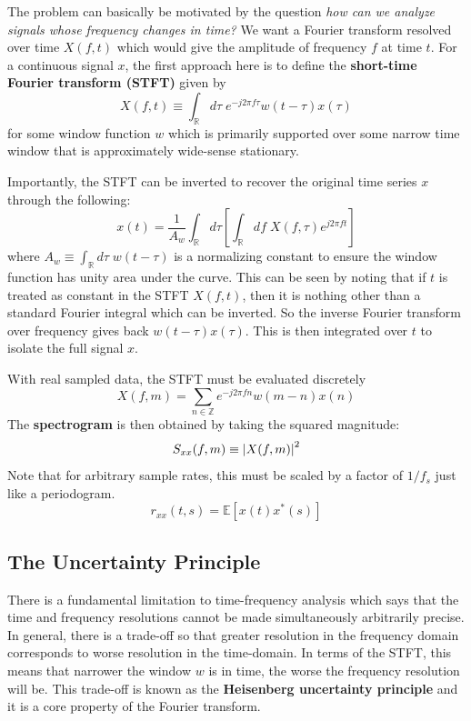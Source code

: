 \documentclass[twocolumn]{gwclass}
\newcommand{\R}{\mathbb{R}}
\newcommand{\Z}{\mathbb{Z}}
\begin{document}
The problem can basically be motivated by the question \emph{how can we analyze signals whose frequency changes in time?} We want a Fourier transform resolved over time $X(f,t)$ which would give the amplitude of frequency $f$ at time $t$. For a continuous signal $x$, the first approach here is to define the \textbf{short-time Fourier transform (STFT)} given by
$$ X(f,t) \equiv \int_\R d\tau\;e^{-j2\pi f \tau}w(t-\tau)x(\tau) $$
for some window function $w$ which is primarily supported over some narrow time window that is approximately wide-sense stationary. 

Importantly, the STFT can be inverted to recover the original time series $x$ through the following:
$$ x(t) = \frac{1}{A_w}\int_\R d\tau\left[\int_\R df\;X(f,\tau)e^{j2\pi f t}\right] $$
where $A_w\equiv \int_\R d\tau\;w(t-\tau)$ is a normalizing constant to ensure the window function has unity area under the curve. This can be seen by noting that if $t$ is treated as constant in the STFT $X(f,t)$, then it is nothing other than a standard Fourier integral which can be inverted. So the inverse Fourier transform over frequency gives back $w(t-\tau)x(\tau)$. This is then integrated over $t$ to isolate the full signal $x$.

With real sampled data, the STFT must be evaluated discretely
$$ X(f,m) = \sum_{n\in\Z} e^{-j2\pi fn}w(m-n)x(n) $$
The \textbf{spectrogram} is then obtained by taking the squared magnitude:
$$ S_{xx}(f,m) \equiv \abs{X(f,m)}^2 $$
Note that for arbitrary sample rates, this must be scaled by a factor of $1/f_s$ just like a periodogram.
$$ r_{xx}(t,s)=\mathbb{E}[x(t)x^*(s)] $$
\subsection{The Uncertainty Principle}
There is a fundamental limitation to time-frequency analysis which says that the time and frequency resolutions cannot be made simultaneously arbitrarily precise. In general, there is a trade-off so that greater resolution in the frequency domain corresponds to worse resolution in the time-domain. In terms of the STFT, this means that narrower the window $w$ is in time, the worse the frequency resolution will be. This trade-off is known as the \textbf{Heisenberg uncertainty principle} and it is a core property of the Fourier transform. 
\end{document}
